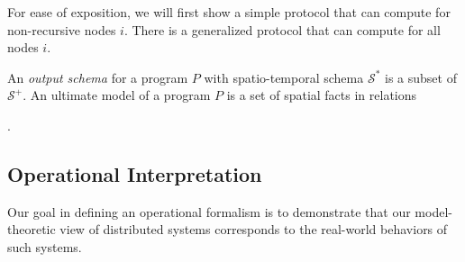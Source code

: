 For ease of exposition, we will first show a simple protocol that can compute  for non-recursive nodes $i$.  There is a generalized protocol that can compute  for all nodes $i$.








An {\em output schema} for a \lang program $P$ with spatio-temporal schema $\mathcal{S}^*$ is a subset of $\mathcal{S}^+$.  An ultimate model of a \lang program $P$ is a set of spatial facts in relations 

.

\subsection{Operational Interpretation}
\label{sec:operational}

Our goal in defining an operational formalism is to demonstrate that our model-theoretic view of distributed systems corresponds to the real-world behaviors of such systems.

